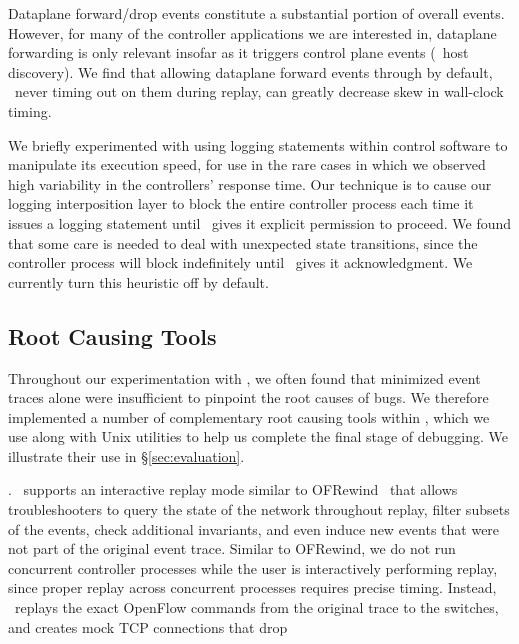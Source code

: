 
 Dataplane forward/drop events constitute a
substantial portion of overall events. However, for
many of the controller applications we are interested in, dataplane
forwarding is only relevant insofar as it triggers control plane events
(\eg~host discovery). We find that allowing dataplane forward events through by
default, \ie~never timing out on them during replay, can greatly decrease
skew in wall-clock timing.

 We briefly experimented
with using logging statements within control software to manipulate its execution speed,
for use in the rare cases in which we observed high variability in the
controllers' response time. Our technique is to cause our logging
interposition layer to block the entire controller
process each time it issues a logging statement until \projectname~gives it
explicit permission to proceed. We found that some care is needed to deal
with unexpected state transitions, since the controller process will block
indefinitely until \projectname~gives it acknowledgment.
We currently turn this heuristic off by default.

\subsection{Root Causing Tools}
\label{subsec:root_causing}

Throughout our experimentation with \projectname, we often found that
minimized event traces alone were insufficient to
pinpoint the root causes of bugs. We therefore implemented a number of
complementary root
causing tools within \projectname,
which we use along with Unix utilities to help us complete the final
stage of debugging. We illustrate their use in \S\ref{sec:evaluation}.

. \projectname~supports an interactive replay mode
similar to OFRewind~\cite{ofrewind} that allows troubleshooters to query the
state of the network throughout replay, filter subsets of the events, check
additional invariants, and
even induce new events that were not part of the original event trace.
 Similar to OFRewind, we do not run concurrent controller processes while the
user is interactively performing replay, since proper replay across
concurrent processes requires precise timing.
Instead, \projectname~replays the exact OpenFlow commands from the
original trace to the switches, and creates mock TCP connections that drop

